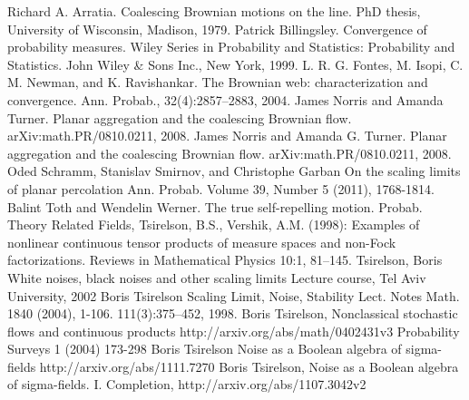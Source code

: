 \begin{thebibliography}{99}
 Richard A. Arratia. Coalescing Brownian motions on
  the line. PhD thesis, University of Wisconsin, Madison, 1979.
 Patrick Billingsley. Convergence of probability
  measures. Wiley Series in Probability and Statistics: Probability
  and Statistics. John Wiley \& Sons Inc., New York, 1999.
 L. R. G. Fontes, M. Isopi, C. M. Newman, and
  K. Ravishankar. The Brownian web: characterization and
  convergence. Ann. Probab., 32(4):2857--2883, 2004.
 James Norris and Amanda
  Turner. Planar aggregation and the coalescing Brownian flow.
  arXiv:math.PR/0810.0211, 2008.
 James Norris and Amanda
  G. Turner. Planar aggregation and the coalescing Brownian
  flow. arXiv:math.PR/0810.0211, 2008.
  Oded Schramm, Stanislav Smirnov, and Christophe Garban
  On the scaling limits of planar percolation
  Ann. Probab. Volume 39, Number 5 (2011), 1768-1814.
 Balint Toth and Wendelin Werner. The true
  self-repelling motion. Probab. Theory Related Fields,
  Tsirelson, B.S., Vershik, A.M. (1998): Examples of nonlinear continuous
  tensor products of measure spaces and non-Fock factorizations. Reviews
  in Mathematical Physics 10:1, 81--145.
  Tsirelson, Boris
  White noises, black noises and other scaling limits
  Lecture course, Tel Aviv University, 2002
  Boris Tsirelson
  Scaling Limit, Noise, Stability
  Lect. Notes Math. 1840 (2004), 1-106.
  111(3):375--452, 1998.
 Boris Tsirelson,
  Nonclassical stochastic flows and continuous products
  http://arxiv.org/abs/math/0402431v3
  Probability Surveys 1 (2004) 173-298
  Boris Tsirelson
  Noise as a Boolean algebra of sigma-fields
  http://arxiv.org/abs/1111.7270
 Boris Tsirelson, Noise as a Boolean
  algebra of sigma-fields. I. Completion, http://arxiv.org/abs/1107.3042v2
\end{thebibliography}
